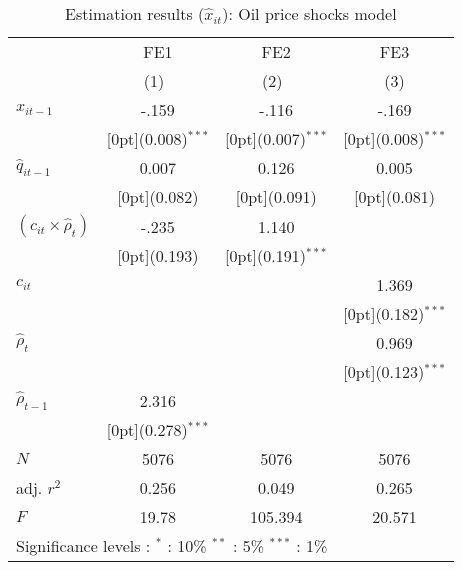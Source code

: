 \documentclass[10pt,letterpaper]{article}
\begin{document}
\begin{table}[htbp]\centering
 \caption{Estimation results ($\hat{x}_{it}$): Oil price shocks model
\label{tab:OilShocksModel}}
\begin{tabular*}{0.6\textwidth}{@{\extracolsep{\fill}}lccc}			
	& \multicolumn{1}{c}{FE1} &	\multicolumn{1}{c}{FE2} &	\multicolumn{1}{c}{FE3} \\
\cline{2-4}			
	& \multicolumn{1}{c}{(1)\mbox{\ }} &	\multicolumn{1}{c}{(2)\mbox{\ }} &	\multicolumn{1}{c}{(3)} \\
\hline			
$x_{it-1}$ &	-.159 &	-.116 &	-.169 \\
&	\raisebox{.7ex}[0pt]{\scriptsize (0.008)$^{***}$} &	\raisebox{.7ex}[0pt]{\scriptsize (0.007)$^{***}$} &	\raisebox{.7ex}[0pt]{\scriptsize (0.008)$^{***}$} \\
$\hat{q}_{it-1}$ &	0.007 &	0.126 &	0.005 \\
&	\raisebox{.7ex}[0pt]{\scriptsize (0.082)} &	\raisebox{.7ex}[0pt]{\scriptsize (0.091)} &	\raisebox{.7ex}[0pt]{\scriptsize (0.081)} \\
$(c_{it} \times \hat{\rho}_{t})$ &	-.235 &	1.140 &	\\
&	\raisebox{.7ex}[0pt]{\scriptsize (0.193)} &	\raisebox{.7ex}[0pt]{\scriptsize (0.191)$^{***}$} &	\\
$c_{it}$ &	&	&	1.369 \\
&	&	&	\raisebox{.7ex}[0pt]{\scriptsize (0.182)$^{***}$} \\
$\hat{\rho}_{t}$ &	&	&	0.969 \\
&	&	&	\raisebox{.7ex}[0pt]{\scriptsize (0.123)$^{***}$} \\
$\hat{\rho}_{t-1}$ &	2.316 &	&	\\
&	\raisebox{.7ex}[0pt]{\scriptsize (0.278)$^{***}$} &	&	\\
\hline
$N$ &	5076 &	5076 &	5076 \\
adj. $r^2$ &	0.256 &	0.049 &	0.265 \\
$F$ &	19.78 &	105.394 &	20.571 \\
\hline\hline	
\multicolumn{4}{l}{\footnotesize{Significance levels
:\hspace{1em} $^{*}$ : 10\% \hspace{1em}
$^{**}$ : 5\% \hspace{1em} $^{***}$ : 1\% \normalsize}}		
\end{tabular*}%
\end{table}


\newpage 
\end{document}
